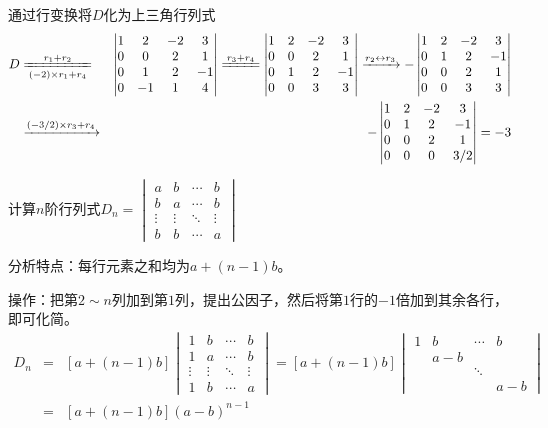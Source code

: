 \begin{solution}
通过行变换将$D$化为上三角行列式
\begin{eqnarray*}
D & \xlongequal[(-2)\times r_1 + r_4]{r_1 + r_2} & \begin{vmatrix} 1 & 2 & -2 & 3 \\ 0 & 0 & 2 & 1 \\ 0 & 1 & 2 & -1 \\ 0 & -1 & 1 & 4 \end{vmatrix} \xlongequal{r_3 + r_4} \begin{vmatrix} 1 & 2 & -2 & 3 \\ 0 & 0 & 2 & 1 \\ 0 & 1 & 2 & -1 \\ 0 & 0 & 3 & 3 \end{vmatrix} \xrightarrow{r_2 \leftrightarrow r_3} -\begin{vmatrix} 1 & 2 & -2 & 3 \\ 0 & 1 & 2 & -1 \\ 0 & 0 & 2 & 1 \\ 0 & 0 & 3 & 3 \end{vmatrix} \\
& \xrightarrow{(-3/2)\times r_3 + r_4} & -\begin{vmatrix} 1 & 2 & -2 & 3 \\ 0 & 1 & 2 & -1 \\ 0 & 0 & 2 & 1 \\ 0 & 0 & 0 & 3/2 \end{vmatrix} = -3
\end{eqnarray*}
\end{solution}

\begin{eg}
计算$n$阶行列式$D_n = \begin{vmatrix}
a & b & \cdots & b \\ b & a & \cdots & b \\ \vdots & \vdots & \ddots & \vdots \\ b & b & \cdots & a \end{vmatrix}$
\end{eg}

\begin{solution}
分析特点：每行元素之和均为$a+(n-1)b$。

操作：把第$2\sim n$列加到第$1$列，提出公因子，然后将第$1$行的$-1$倍加到其余各行，即可化简。
\begin{eqnarray*}
D_n & = & [a+(n-1)b] \begin{vmatrix} 1 & b & \cdots & b \\ 1 & a & \cdots & b \\ \vdots & \vdots & \ddots & \vdots \\ 1 & b & \cdots & a \end{vmatrix} = [a+(n-1)b] \begin{vmatrix} 1 & b & \cdots & b \\ & a-b & & \\ & & \ddots & \\ & & & a-b \end{vmatrix} \\
& = & [a+(n-1)b](a-b)^{n-1}
\end{eqnarray*}
\end{solution}

